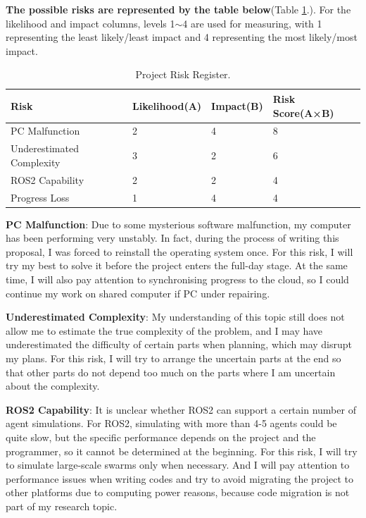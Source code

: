 \documentclass[12pt, oneside]{article}
\begin{document}
\textbf{The possible risks are represented by the table below}(Table \ref{RiskRegister}.). For the likelihood and impact columns, levels 1$\sim$4 are used for measuring, with 1 representing the least likely/least impact and 4 representing the most likely/most impact.



\begin{table}[]
\begin{tabular}{|l|l|l|l|}
\hline
Risk                      & Likelihood(A) & Impact(B) & Risk Score(A×B) \\ \hline
PC Malfunction            & 2             & 4         & 8               \\ \hline
Underestimated Complexity & 3             & 2         & 6               \\ \hline
ROS2 Capability           & 2             & 2         & 4               \\ \hline
Progress Loss             & 1             & 4         & 4               \\ \hline
\end{tabular}
\caption{Project Risk Register.}
\label{RiskRegister}

\end{table}



\textbf{PC Malfunction}: Due to some mysterious software malfunction, my computer has been performing very unstably. In fact, during the process of writing this proposal, I was forced to reinstall the operating system once. For this risk, I will try my best to solve it before the project enters the full-day stage. At the same time, I will also pay attention to synchronising progress to the cloud, so I could continue my work on shared computer if PC under repairing.

\textbf{Underestimated Complexity}: My understanding of this topic still does not allow me to estimate the true complexity of the problem, and I may have underestimated the difficulty of certain parts when planning, which may disrupt my plans. For this risk, I will try to arrange the uncertain parts at the end so that other parts do not depend too much on the parts where I am uncertain about the complexity.

\textbf{ROS2 Capability}: It is unclear whether ROS2 can support a certain number of agent simulations. For ROS2, simulating with more than 4-5 agents could be quite slow, but the specific performance depends on the project and the programmer, so it cannot be determined at the beginning. For this risk, I will try to simulate large-scale swarms only when necessary. And I will pay attention to performance issues when writing codes and try to avoid migrating the project to other platforms due to computing power reasons, because code migration is not part of my research topic.
\end{document}
